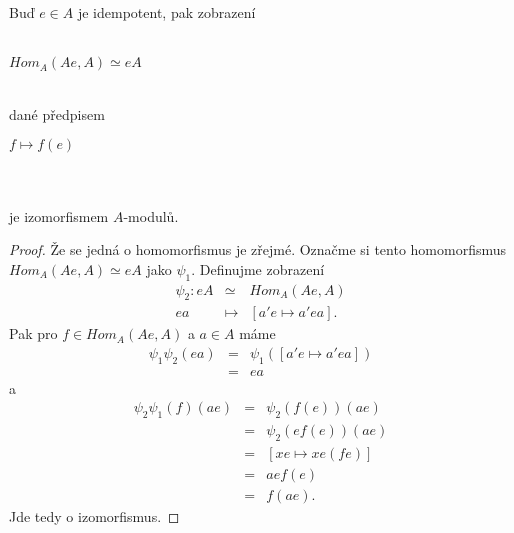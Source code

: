      \begin{thm}\label{izo-hom-aei}
       Buď $e\in A$ je idempotent, pak zobrazení \\\\
       \centerline{$Hom_A(Ae,A)\simeq eA$}\\
       dané předpisem\\
       \centerline{$f\mapsto f(e)$} \\\\
       je izomorfismem $A$-modulů.
     \end{thm}
     \begin{proof}
       Že se jedná o homomorfismus je zřejmé.
       Označme si tento homomorfismus $Hom_A(Ae,A)\simeq eA$ jako $\psi_1$.  
       Definujme zobrazení
       \begin{eqnarray}
         \psi_2:eA &\simeq& Hom_A(Ae,A) \nonumber \\
         ea &\mapsto& [a'e\mapsto a'ea].  \nonumber
       \end{eqnarray}
       Pak pro $f\in Hom_A(Ae,A)$ a $a\in A$ máme
       \begin{eqnarray}
         \psi_1\psi_2(ea)&=&\psi_1([a'e\mapsto a'ea]) \nonumber \\
         &=&ea \nonumber
       \end{eqnarray}
       a
       \begin{eqnarray}
         \psi_2\psi_1(f)(ae)&=&\psi_2(f(e))(ae) \nonumber\\
         &=&\psi_2(ef(e))(ae) \nonumber\\
         &=&[xe\mapsto xe(fe)] \nonumber\\
         &=&aef(e) \nonumber \\
         &=&f(ae). \nonumber
       \end{eqnarray}
       Jde tedy o izomorfismus.
     \end{proof}
     
